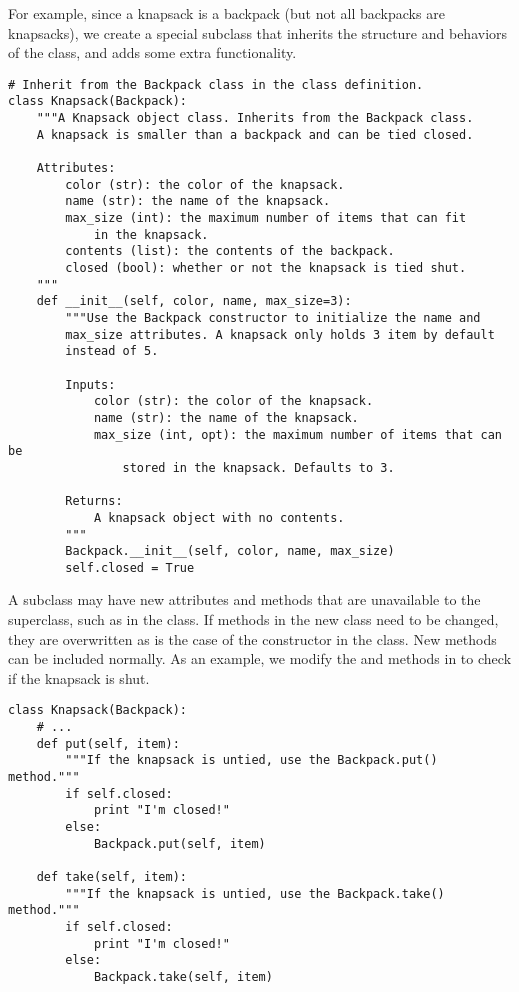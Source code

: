 For example, since a knapsack is a backpack (but not all backpacks are knapsacks), we create a special  subclass that inherits the structure and behaviors of the  class, and adds some extra functionality.

\begin{lstlisting}
# Inherit from the Backpack class in the class definition.
class Knapsack(Backpack):
    """A Knapsack object class. Inherits from the Backpack class.
    A knapsack is smaller than a backpack and can be tied closed.
    
    Attributes:
        color (str): the color of the knapsack.
        name (str): the name of the knapsack.
        max_size (int): the maximum number of items that can fit
            in the knapsack.
        contents (list): the contents of the backpack.
        closed (bool): whether or not the knapsack is tied shut.
    """
    def __init__(self, color, name, max_size=3):
        """Use the Backpack constructor to initialize the name and
        max_size attributes. A knapsack only holds 3 item by default
        instead of 5.

        Inputs:
            color (str): the color of the knapsack.
            name (str): the name of the knapsack.
            max_size (int, opt): the maximum number of items that can be
                stored in the knapsack. Defaults to 3.
        
        Returns:
            A knapsack object with no contents.
        """
        Backpack.__init__(self, color, name, max_size)
        self.closed = True
\end{lstlisting}

A subclass may have new attributes and methods that are unavailable to the superclass, such as  in the  class.
If methods in the new class need to be changed, they are overwritten as is the case of the constructor in the  class.
New methods can be included normally.
As an example, we modify the  and  methods in  to check if the knapsack is shut.

\begin{lstlisting}
class Knapsack(Backpack):
    # ...
    def put(self, item):
        """If the knapsack is untied, use the Backpack.put() method."""
        if self.closed:
            print "I'm closed!"
        else:
            Backpack.put(self, item)
    
    def take(self, item):
        """If the knapsack is untied, use the Backpack.take() method."""
        if self.closed:
            print "I'm closed!"
        else:
            Backpack.take(self, item)
\end{lstlisting}

